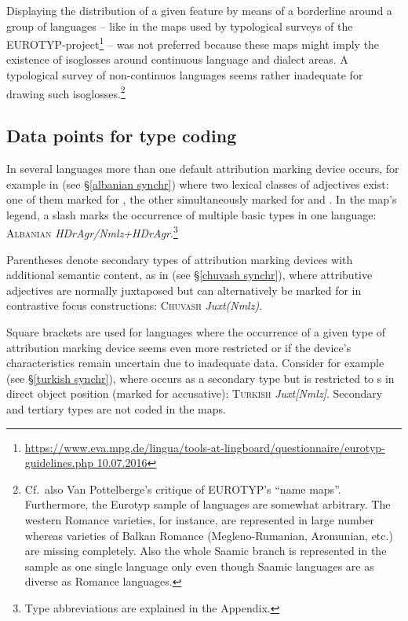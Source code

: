 Displaying the distribution of a given feature by means of a borderline around a group of languages – like in the maps used by typological surveys of the EUROTYP\hyp{}project\footnote{\url{https://www.eva.mpg.de/lingua/tools-at-lingboard/questionnaire/eurotyp-guidelines.php 10.07.2016}} – was not preferred because these maps might imply the existence of isoglosses around continuous language and dialect areas. A typological survey of non-continuos languages seems rather inadequate for drawing such isoglosses.\footnote{Cf.~also Van Pottelberge's \citeyear{van-pottelberge2001} critique of EUROTYP's “name maps”. Furthermore, the Eurotyp sample of languages are somewhat arbitrary. The western Romance varieties, for instance, are represented in large number whereas varieties of Balkan Romance (Megleno-Rumanian, Aromunian, etc.) are missing completely. Also the whole Saamic branch is represented in the  sample as one single language only even though Saamic languages are as diverse as Romance languages.}

\subsection[Type coding]{Data points for type coding}
In several languages more than one default attribution marking device occurs, for example in  (see \S\ref{albanian synchr}) where two lexical classes of adjectives exist: one of them marked for , the other simultaneously marked for  and . In the map's legend, a slash marks the occurrence of multiple basic types in one language: \textsc{Albanian} \textit{HDrAgr/Nmlz+HDrAgr}.\footnote{Type abbreviations are explained in the Appendix.}

Parentheses denote secondary types of attribution marking devices with additional semantic content, as in  (see \S\ref{chuvash synchr}), where attributive adjectives are normally juxtaposed but can alternatively be marked for  in contrastive focus constructions: \textsc{Chuvash} \textit{Juxt(Nmlz)}.

Square brackets are used for languages where the occurrence of a given type of attribution marking device seems even more restricted or if the device's characteristics remain uncertain due to inadequate data. Consider for example  (see \S\ref{turkish synchr}), where  occurs as a secondary type but is restricted to s in direct object position (marked for accusative): \textsc{Turkish} \textit{Juxt[Nmlz]}. 
Secondary and tertiary types are not coded in the maps. 


